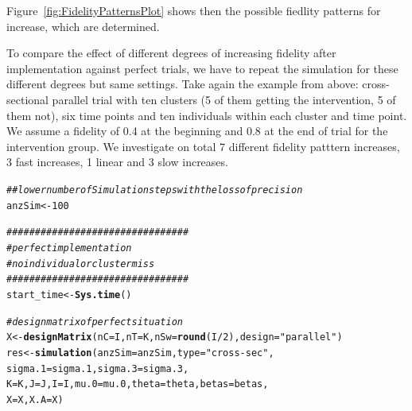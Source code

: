 \documentclass{article}\usepackage[]{graphicx}\usepackage[]{color}
\makeatletter
\newcommand{\hlnum}[1]{\textcolor[rgb]{0.686,0.059,0.569}{#1}}%
\newcommand{\hlstr}[1]{\textcolor[rgb]{0.192,0.494,0.8}{#1}}%
\newcommand{\hlcom}[1]{\textcolor[rgb]{0.678,0.584,0.686}{\textit{#1}}}%
\newcommand{\hlopt}[1]{\textcolor[rgb]{0,0,0}{#1}}%
\newcommand{\hlstd}[1]{\textcolor[rgb]{0.345,0.345,0.345}{#1}}%
\newcommand{\hlkwb}[1]{\textcolor[rgb]{0.69,0.353,0.396}{#1}}%
\newcommand{\hlkwc}[1]{\textcolor[rgb]{0.333,0.667,0.333}{#1}}%
\newcommand{\hlkwd}[1]{\textcolor[rgb]{0.737,0.353,0.396}{\textbf{#1}}}%
\newenvironment{kframe}{%
 \def\at@end@of@kframe{}%
 \ifinner\ifhmode%
  \def\at@end@of@kframe{\end{minipage}}%
  \begin{minipage}{\columnwidth}%
 \fi\fi%
 \def\FrameCommand##1{\hskip\@totalleftmargin \hskip-\fboxsep
 \colorbox{shadecolor}{##1}\hskip-\fboxsep
     \hskip-\linewidth \hskip-\@totalleftmargin \hskip\columnwidth}%
 \MakeFramed {\advance\hsize-\width
   \@totalleftmargin\z@ \linewidth\hsize
   \@setminipage}}%
 {\par\unskip\endMakeFramed%
 \at@end@of@kframe}
\newenvironment{knitrout}{}{} %
\makeatother
\begin{document}
Figure~\ref{fig:FidelityPatternsPlot} shows then the possible fiedlity patterns for increase, which are determined.

To compare the effect of different degrees of increasing fidelity after implementation against perfect trials, we have to repeat the simulation for these different degrees but same settings. Take again the example from above: cross-sectional parallel trial with ten clusters (5 of them getting the intervention, 5 of them not), six time points and ten individuals within each cluster and time point. We assume a fidelity of 0.4 at the beginning and 0.8 at the end of trial for the intervention group. We investigate on total 7 different fidelity patttern increases, 3 fast increases, 1 linear and 3 slow increases.

\begin{knitrout}
\color{fgcolor}\begin{kframe}
\begin{alltt}
\hlcom{##lower number of Simulation steps with the loss of precision}
\hlstd{anzSim}\hlkwb{<-}\hlnum{100}

\hlcom{################################}
\hlcom{# perfect implementation}
\hlcom{# no individual or cluster miss}
\hlcom{################################}
\hlstd{start_time} \hlkwb{<-} \hlkwd{Sys.time}\hlstd{()}

\hlcom{#design matrix of perfect situation}
\hlstd{X}\hlkwb{<-}\hlkwd{designMatrix}\hlstd{(}\hlkwc{nC}\hlstd{=I,} \hlkwc{nT}\hlstd{=K,} \hlkwc{nSw}\hlstd{=}\hlkwd{round}\hlstd{(I}\hlopt{/}\hlnum{2}\hlstd{),} \hlkwc{design}\hlstd{=}\hlstr{"parallel"}\hlstd{)}
\hlstd{res}\hlkwb{<-}\hlkwd{simulation}\hlstd{(}\hlkwc{anzSim}\hlstd{=anzSim,}\hlkwc{type}\hlstd{=}\hlstr{"cross-sec"}\hlstd{,}
                   \hlkwc{sigma.1}\hlstd{=sigma.1,}\hlkwc{sigma.3}\hlstd{=sigma.3,}
                   \hlkwc{K}\hlstd{=K,}\hlkwc{J}\hlstd{=J,}\hlkwc{I}\hlstd{=I,}\hlkwc{mu.0}\hlstd{=mu.0,} \hlkwc{theta}\hlstd{=theta,}\hlkwc{betas}\hlstd{=betas,}
                   \hlkwc{X}\hlstd{=X,} \hlkwc{X.A}\hlstd{=X)}
\end{alltt}



\end{kframe}
\end{knitrout}
\end{document}
